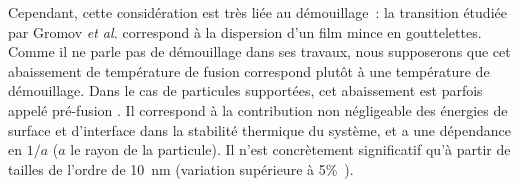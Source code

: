Cependant, cette considération est très liée au démouillage~: la transition étudiée par Gromov \textit{et al.} correspond à la dispersion d'un film mince en gouttelettes. Comme il ne parle pas de démouillage dans ses travaux, nous supposerons que cet abaissement de température de fusion correspond plutôt à une température de démouillage. Dans le cas de particules supportées, cet abaissement est parfois appelé \og pré-fusion \fg{}. Il correspond à la contribution non négligeable des énergies de surface et d'interface dans la stabilité thermique du système, et a une dépendance en $1/a$ ($a$ le rayon de la particule). Il n'est concrètement significatif qu'à partir de tailles de l'ordre de 10~nm (variation supérieure à 5\%~\cite{takagi1954electron}).\par 


